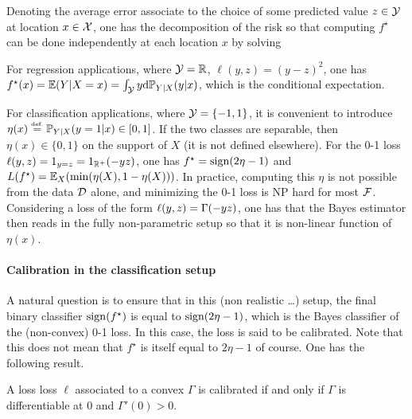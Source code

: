 Denoting 
the average error associate to the choice of some predicted value $z \in \mathcal{Y}$ at location $x \in \mathcal{X}$, one has the decomposition of the risk
so that computing $f^\star$ can be done independently at each location $x$ by solving

\begin{exmp}[Regression]
For regression applications, where $\mathcal{Y}=\mathbb{R}$, $\ell(y,z) = (y-z)^2$, one has $f^\star(x)=\mathbb{E}(Y|X=x) = \int_{\mathcal{Y}} y \mathrm{d} \mathbb{P}_{Y|X}(y|x)$, which is the conditional expectation.
\end{exmp}

\begin{exmp}[Classification]
For classification applications, where $\mathcal{Y} = \{-1,1\}$, it is convenient to introduce $\eta(x) \stackrel{\mbox{\upshape\tiny def.}}{=} \mathbb{P}_{Y|X}(y=1|x) \in [0,1]$.
%
If the two classes are separable, then $\eta(x) \in \{0,1\}$ on the support of $X$ (it is not defined elsewhere). 
%
For the 0-1 loss $\ell(y,z)=1_{y=z}=1_{\mathbb{R}^+}(-yz)$, one has $f^\star = \operatorname{sign}(2\eta-1)$ and $L(f^\star) = \mathbb{E}_X( \min(\eta(X),1-\eta(X)) )$.
%
In practice, computing this $\eta$ is not possible from the data $\mathcal{D}$ alone, and minimizing the 0-1 loss is NP hard for most $\mathcal{F}$. 
%
Considering a loss of the form $\ell(y,z)=\Gamma(-yz)$, one has that the Bayes estimator then reads in the fully non-parametric setup
so that it is non-linear function of $\eta(x)$.
\end{exmp}

\paragraph{Calibration in the classification setup}

A natural question is to ensure that in this (non realistic \ldots) setup, the final binary classifier $\operatorname{sign}(f^\star)$ is equal to $\operatorname{sign}(2\eta-1)$, which is the Bayes classifier of the (non-convex) 0-1 loss. In this case, the loss is said to be calibrated. Note that this does not mean that $f^\star$ is itself equal to $2\eta-1$ of course.  One has the following result.

\begin{prop}
	A loss loss $\ell$ associated to a convex $\Gamma$ is calibrated if and only if $\Gamma$ is differentiable at $0$ and $\Gamma'(0)>0$.
\end{prop}

